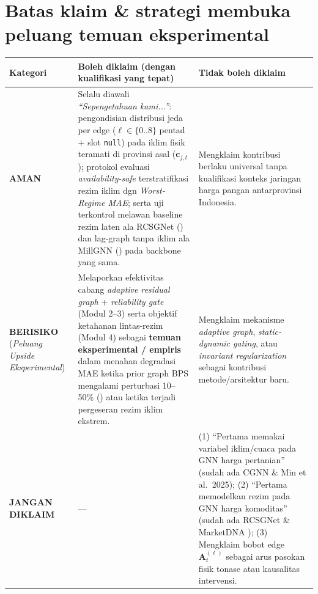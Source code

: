 \documentclass[11pt,a4paper]{article}
\begin{document}
\section{Batas klaim \& strategi membuka peluang temuan eksperimental}
\begin{table}[H]
\centering
\footnotesize
\begin{tabular}{@{}L{2.2cm}L{6.0cm}L{6.0cm}@{}}
\toprule
Kategori & Boleh diklaim (dengan kualifikasi yang tepat) & Tidak boleh diklaim \\
\midrule
\textbf{AMAN} & Selalu diawali \emph{``Sepengetahuan kami...''}: pengondisian distribusi jeda per edge ($\ell \in \{0..8\}$ pentad + slot \texttt{null}) pada iklim fisik teramati di provinsi asal ($\mathbf{c}_{j,t}$); protokol evaluasi \emph{availability-safe} terstratifikasi rezim iklim dgn \emph{Worst-Regime MAE}; serta uji terkontrol melawan baseline rezim laten ala RCSGNet () dan lag-graph tanpa iklim ala MillGNN () pada backbone yang sama. & Mengklaim kontribusi berlaku universal tanpa kualifikasi konteks jaringan harga pangan antarprovinsi Indonesia. \\
\midrule
\textbf{BERISIKO} (\emph{Peluang Upside Eksperimental}) & Melaporkan efektivitas cabang \emph{adaptive residual graph} + \emph{reliability gate} (Modul 2--3) serta objektif ketahanan lintas-rezim (Modul 4) sebagai \textbf{temuan eksperimental / empiris} dalam menahan degradasi MAE ketika prior graph BPS mengalami perturbasi 10--50\% () atau ketika terjadi pergeseran rezim iklim ekstrem. & Mengklaim mekanisme \emph{adaptive graph}, \emph{static-dynamic gating}, atau \emph{invariant regularization} sebagai kontribusi metode/arsitektur baru. \\
\midrule
\textbf{JANGAN DIKLAIM} & --- & (1) ``Pertama memakai variabel iklim/cuaca pada GNN harga pertanian'' (sudah ada CGNN \cite{cgnn2023} \& Min et al.\ 2025); (2) ``Pertama memodelkan rezim pada GNN harga komoditas'' (sudah ada RCSGNet \cite{bai2026rcsgnet} \& MarketDNA \cite{marketdna2026}); (3) Mengklaim bobot edge $\mathbf{A}_t^{(\ell)}$ sebagai arus pasokan fisik tonase atau kausalitas intervensi. \\
\bottomrule
\end{tabular}
\end{table}
\end{document}
